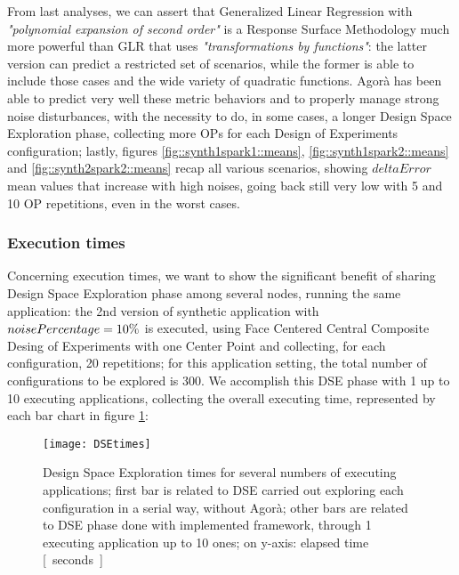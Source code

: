 From last analyses, we can assert that Generalized Linear Regression with \textit{"polynomial expansion of second order"} is a Response Surface Methodology much more powerful than GLR that uses \textit{"transformations by functions"}: the latter version can predict a restricted set of scenarios, while the former is able to include those cases and the wide variety of quadratic functions. Agorà has been able to predict very well these metric behaviors and to properly manage strong noise disturbances, with the necessity to do, in some cases, a longer Design Space Exploration phase, collecting more OPs for each Design of Experiments configuration; lastly, figures \ref{fig::synth1spark1::means}, \ref{fig::synth1spark2::means} and \ref{fig::synth2spark2::means} recap all various scenarios, showing $deltaError$ mean values that increase with high noises, going back still very low with 5 and 10 OP repetitions, even in the worst cases.


\subsubsection{Execution times}

Concerning execution times, we want to show the significant benefit of sharing Design Space Exploration phase among several nodes, running the same application: the 2nd version of synthetic application with $noise\-Percentage = 10\%$ is executed, using Face Centered Central Composite Desing of Experiments with one Center Point and collecting, for each configuration, 20 repetitions; for this application setting, the total number of configurations to be explored is 300. We accomplish this DSE phase with 1 up to 10 executing applications, collecting the overall executing time, represented by each bar chart in figure \ref{fig::DSEtimes}:

\begin{figure}[H]

    \centering
    \texttt{[image: DSEtimes]}
    \caption{Design Space Exploration times for several numbers of executing applications; first bar is related to DSE carried out exploring each configuration in a serial way, without Agorà; other bars are related to DSE phase done with implemented framework, through 1 executing application up to 10 ones; on y-axis: elapsed time \hbox{[ seconds ]}}
    \label{fig::DSEtimes}
    
\end{figure}

